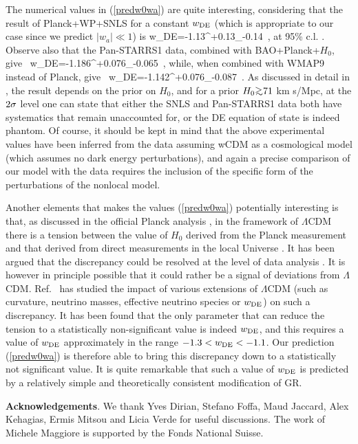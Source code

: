 \documentclass[aps,prd,twocolumn,superscriptaddress,nofootinbib]{revtex4}
\begin{document}
The numerical values in  (\ref{predw0wa})
are quite interesting, considering that the   result of Planck+WP+SNLS
 for a constant $w_{\rm DE}$ (which is appropriate to our case since we predict $|w_a|\ll 1$)  is  
 \be
 w_{\rm DE}=-1.13^{+0.13}_{-0.14}\, ,
 \ee
at 95\% c.l. \cite{Ade:2013zuv}. Observe also that the Pan-STARRS1 data, combined with 
BAO+Planck+$H_0$, give~\cite{Rest:2013bya} 
\be
w_{\rm DE}=-1.186^{+0.076}_{-0.065}\, ,
\ee 
while, when combined with 
WMAP9 instead of Planck,  give~\cite{Rest:2013bya} 
\be
w_{\rm DE}=-1.142^{+0.076}_{-0.087}\, .
\ee  
As discussed in detail in \cite{Shafer:2013pxa}, the result depends on the prior on $H_0$, and for a prior $H_0\gsim 71$ km s/Mpc, 
at the  $2\sigma$ level one can state that either the SNLS and  Pan-STARRS1 data both
have systematics that remain unaccounted for, or  the DE equation of state is indeed phantom. Of course, it should be kept in mind that the above experimental values have been inferred from the data  assuming wCDM 
as a cosmological model (which assumes no dark energy perturbations), and again a precise comparison of our model with the data requires the inclusion of the specific form of the perturbations of the nonlocal model. 

Another elements that makes the values (\ref{predw0wa}) potentially interesting is that,
as discussed in the official Planck analysis \cite{Ade:2013zuv}, in the framework of 
$\Lambda$CDM there is a tension between 
 the value of $H_0$  derived from the Planck measurement  and that derived from  direct measurements in the local Universe \cite{Riess:2011yx,Freedman:2012ny}. It has been argued that the discrepancy could be resolved at the level of data analysis \cite{Efstathiou:2013via}. It is however in principle possible that it could  rather be a signal of deviations from $\Lambda$CDM.  Ref.~\cite{Verde:2013wza} has studied the impact of  various extensions of $\Lambda$CDM (such as curvature, neutrino masses, effective neutrino species or $w_{\rm DE}$) on such a discrepancy. It has been found that the only parameter that can reduce the tension to a statistically non-significant value is indeed $w_{\rm DE}$, and this requires a value of $w_{\rm DE}$ approximately in the range
$-1.3< w_{\rm DE}<-1.1$. Our prediction (\ref{predw0wa}) is
therefore  able to bring this discrepancy down to a statistically not significant value.
It is quite remarkable that such a value of  $w_{\rm DE}$ is predicted by a relatively simple and theoretically consistent modification of GR.

\vspace{5mm}
\noindent
{\bf Acknowledgements}.
We thank  Yves Dirian, Stefano Foffa, Maud Jaccard, Alex Kehagias, Ermis Mitsou and Licia Verde for  useful discussions. The work of Michele Maggiore is  supported by the Fonds National Suisse.


%

\end{document}
